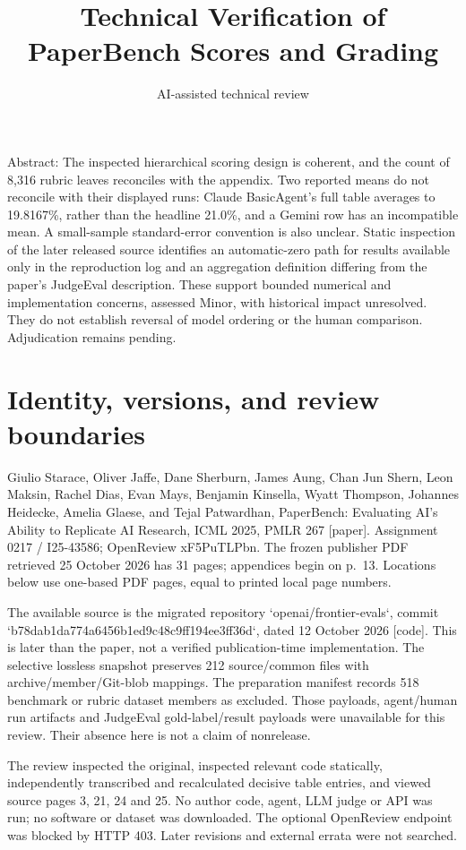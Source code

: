 \documentclass[10pt]{article}
\title{Technical Verification of PaperBench Scores and Grading}
\author{AI-assisted technical review}
\date{}
\begin{document}
\maketitle
Abstract: The inspected hierarchical scoring design is coherent, and the count of 8,316 rubric leaves reconciles with the appendix. Two reported means do not reconcile with their displayed runs: Claude BasicAgent’s full table averages to 19.8167\%, rather than the headline 21.0\%, and a Gemini row has an incompatible mean. A small-sample standard-error convention is also unclear. Static inspection of the later released source identifies an automatic-zero path for results available only in the reproduction log and an aggregation definition differing from the paper’s JudgeEval description. These support bounded numerical and implementation concerns, assessed Minor, with historical impact unresolved. They do not establish reversal of model ordering or the human comparison. Adjudication remains pending.\par
\section*{Identity, versions, and review boundaries}
Giulio Starace, Oliver Jaffe, Dane Sherburn, James Aung, Chan Jun Shern, Leon Maksin, Rachel Dias, Evan Mays, Benjamin Kinsella, Wyatt Thompson, Johannes Heidecke, Amelia Glaese, and Tejal Patwardhan, PaperBench: Evaluating AI’s Ability to Replicate AI Research, ICML 2025, PMLR 267 [paper]. Assignment 0217 / I25-43586; OpenReview xF5PuTLPbn. The frozen publisher PDF retrieved 25 October 2026 has 31 pages; appendices begin on p. 13. Locations below use one-based PDF pages, equal to printed local page numbers.\par
The available source is the migrated repository `openai/frontier-evals`, commit `b78dab1da774a6456b1ed9c48c9ff194ee3ff36d`, dated 12 October 2026 [code]. This is later than the paper, not a verified publication-time implementation. The selective lossless snapshot preserves 212 source/common files with archive/member/Git-blob mappings. The preparation manifest records 518 benchmark or rubric dataset members as excluded. Those payloads, agent/human run artifacts and JudgeEval gold-label/result payloads were unavailable for this review. Their absence here is not a claim of nonrelease.\par
The review inspected the original, inspected relevant code statically, independently transcribed and recalculated decisive table entries, and viewed source pages 3, 21, 24 and 25. No author code, agent, LLM judge or API was run; no software or dataset was downloaded. The optional OpenReview endpoint was blocked by HTTP 403. Later revisions and external errata were not searched.\par
\end{document}
